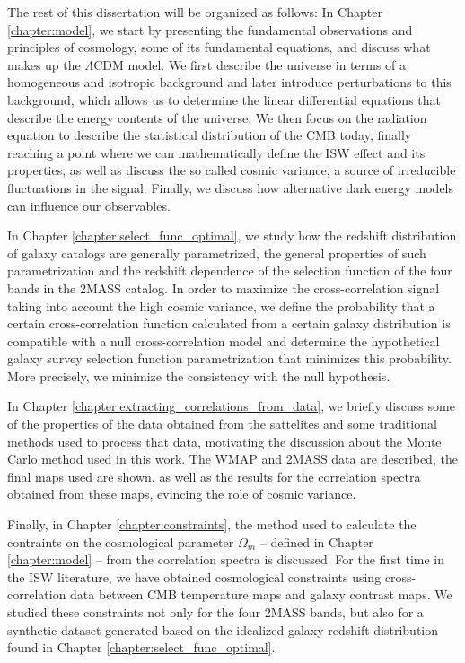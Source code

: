 \documentclass[openany,a4paper,12pt,oneside]{book}
\begin{document}
\begin{spacing}{1.5}
The rest of this dissertation will be organized as follows: In Chapter \ref{chapter:model}, we start by presenting the fundamental observations and principles of cosmology, some of its fundamental equations, and discuss what makes up the $\Lambda$CDM model. We first describe the universe in terms of a homogeneous and isotropic background and later introduce perturbations to this background, which allows us to determine the linear differential equations that describe the energy contents of the universe. We then focus on the radiation equation to describe the statistical distribution of the CMB today, finally reaching a point where we can mathematically define the ISW effect and its properties, as well as discuss the so called cosmic variance, a source of irreducible fluctuations in the signal. Finally, we discuss how alternative dark energy models can influence our observables.

In Chapter \ref{chapter:select_func_optimal}, we study how the redshift distribution of galaxy catalogs are generally parametrized, the general properties of such parametrization and the redshift dependence of the selection function of the four bands in the 2MASS catalog. In order to maximize the cross-correlation signal taking into account the high cosmic variance, we define the probability that a certain cross-correlation function calculated from a certain galaxy distribution is compatible with a null cross-correlation model and determine the hypothetical galaxy survey selection function parametrization that minimizes this probability. More precisely, we minimize the consistency with the null hypothesis.

In Chapter \ref{chapter:extracting_correlations_from_data}, we briefly discuss some of the properties of the data obtained from the sattelites and some traditional methods used to process that data, motivating the discussion about the Monte Carlo method used in this work. The WMAP and 2MASS data are described, the final maps used are shown, as well as the results for the correlation spectra obtained from these maps, evincing the role of cosmic variance.

Finally, in Chapter \ref{chapter:constraints}, the method used to calculate the contraints on the cosmological parameter $\Omega_m$ -- defined in Chapter \ref{chapter:model} -- from the correlation spectra is discussed. For the first time in the ISW literature, we have obtained cosmological constraints using cross-correlation data between CMB temperature maps and galaxy contrast maps. We studied these constraints not only for the four 2MASS bands, but also for a synthetic dataset generated based on the idealized galaxy redshift distribution found in Chapter \ref{chapter:select_func_optimal}. 


\end{spacing}
\end{document}
